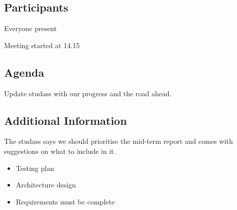 \subsection{Participants}
Everyone present

Meeting started at 14.15

\subsection{Agenda}
Update studass with our progress and the road ahead.

\subsection{Additional Information}
The studass says we should prioritise the mid-term report and comes with suggestions on what to include in it. 
\begin{itemize}
\item Testing plan
\item Architecture design
\item Requirements must be complete
\end{itemize}
